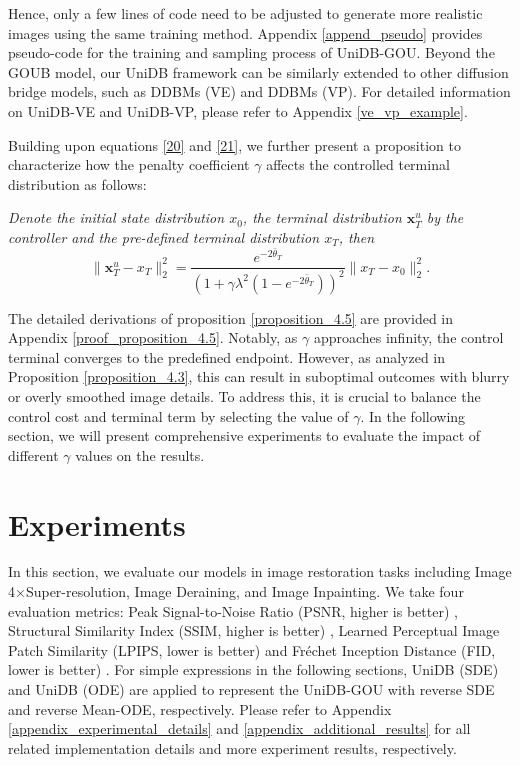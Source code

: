 \vspace{-2mm}

Hence, only a few lines of code need to be adjusted to generate more realistic images using the same training method. Appendix \ref{append_pseudo} provides pseudo-code for the training and sampling process of UniDB-GOU. Beyond the GOUB model, our UniDB framework can be similarly extended to other diffusion bridge models, such as DDBMs (VE) and DDBMs (VP). For detailed information on UniDB-VE and UniDB-VP, please refer to Appendix \ref{ve_vp_example}. 

Building upon equations \eqref{20} and \eqref{21}, we further present a proposition to characterize how the penalty coefficient $\gamma$ affects the controlled terminal distribution as follows: 
\begin{proposition}\label{proposition_4.5}
\textit{Denote the initial state distribution $x_0$, the terminal distribution $\mathbf{x}_T^u$ by the controller and the pre-defined terminal distribution $x_T$, then}
\begin{equation}\label{terminal_distance}
    \| \mathbf{x}_T^u - x_T \|^2_2 = \frac{e^{-2\bar{\theta}_{T}}}{\left( 1 + \gamma \lambda^2 (1 - e^{-2\bar{\theta}_{T}}) \right)^2} \| x_T - x_0 \|^2_2.
\end{equation}
\end{proposition}



The detailed derivations of proposition \ref{proposition_4.5} are provided in Appendix \ref{proof_proposition_4.5}. Notably, as $\gamma$ approaches infinity, the control terminal converges to the predefined endpoint. However, as analyzed in Proposition \ref{proposition_4.3}, this can result in suboptimal outcomes with blurry or overly smoothed image details. To address this, it is crucial to balance the control cost and terminal term by selecting the value of $\gamma$. In the following section, we will present comprehensive experiments to evaluate the impact of different $\gamma$ values on the results. 

\section{Experiments}
In this section, we evaluate our models in image restoration tasks including Image 4$\times$Super-resolution, Image Deraining, and Image Inpainting. We take four evaluation metrics: Peak Signal-to-Noise Ratio (PSNR, higher is better) \cite{fardo2016formalevaluationpsnrquality}, Structural Similarity Index (SSIM, higher is better) \cite{1284395}, Learned Perceptual Image Patch Similarity (LPIPS, lower is better) \cite{zhang2018unreasonableeffectivenessdeepfeatures} and Fréchet Inception Distance (FID, lower is better) \cite{heusel2018ganstrainedtimescaleupdate}. For simple expressions in the following sections, UniDB (SDE) and UniDB (ODE) are applied to represent the UniDB-GOU with reverse SDE and reverse Mean-ODE, respectively. Please refer to Appendix \ref{appendix_experimental_details} and \ref{appendix_additional_results} for all related implementation details and more experiment results, respectively. 

